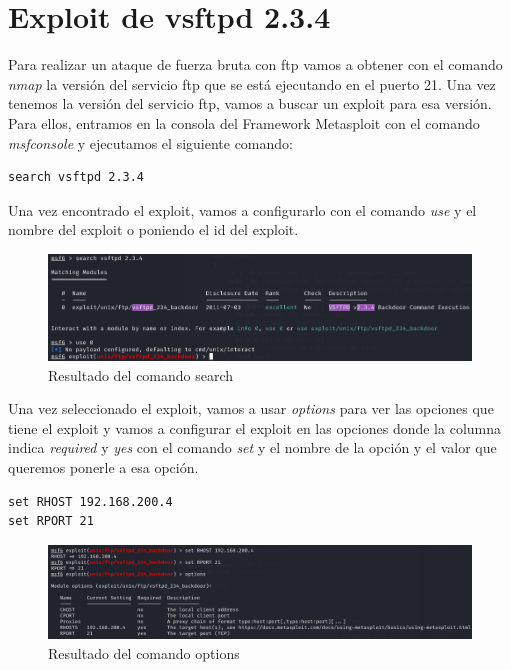 \documentclass[11pt]{report}
\begin{document}


\section{Exploit de vsftpd 2.3.4}
Para realizar un ataque de fuerza bruta con ftp vamos a obtener con el comando \emph{nmap} la versión del servicio ftp que se está ejecutando en el puerto 21.
Una vez tenemos la versión del servicio ftp, vamos a buscar un exploit para esa versión. Para ellos, entramos en la consola del Framework Metasploit con el comando \emph{msfconsole} y ejecutamos el siguiente comando:
\begin{BVerbatim}
search vsftpd 2.3.4
\end{BVerbatim}

Una vez encontrado el exploit, vamos a configurarlo con el comando \emph{use} y el nombre del exploit o poniendo el id del exploit.
\begin{figure}[H]
  \centering
  \includegraphics[scale=0.5]{img/search_vsftpd.png}
  \caption{Resultado del comando search}
\end{figure}

Una vez seleccionado el exploit, vamos a usar \emph{options} para ver las opciones que tiene el exploit y vamos a configurar el exploit en las opciones donde la columna indica \emph{required} y \emph{yes} con el comando 
\emph{set} y el nombre de la opción y el valor que queremos ponerle a esa opción.
\begin{verbatim}
set RHOST 192.168.200.4
set RPORT 21
\end{verbatim}

\begin{figure}[H]
  \centering
  \includegraphics[scale=0.51]{img/options_vsftpd.png}
  \caption{Resultado del comando options}
\end{figure}
\end{document}
